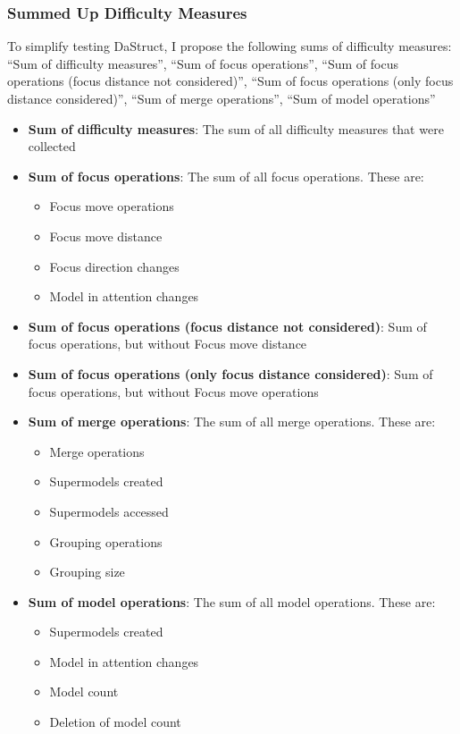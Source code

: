 \documentclass[hidelinks]{scrartcl}
\begin{document}
\subsubsection{Summed Up Difficulty Measures}\label{sec:diff_measures_summed_up}
To simplify testing DaStruct, I propose the following sums of difficulty measures:
``Sum of difficulty measures'', ``Sum of focus operations'', ``Sum of focus operations (focus distance not considered)'', ``Sum of focus operations (only focus distance considered)'', ``Sum of merge operations'', ``Sum of model operations''
\begin{itemize}
	\item \textbf{Sum of difficulty measures}: The sum of all difficulty measures that were collected
	\item \textbf{Sum of focus operations}: The sum of all focus operations. These are:
	\begin{itemize}
		\item Focus move operations
		\item Focus move distance
		\item Focus direction changes
		\item Model in attention changes
	\end{itemize}
	\item \textbf{Sum of focus operations (focus distance not considered)}: Sum of focus operations, but without Focus move distance
	\item \textbf{Sum of focus operations (only focus distance considered)}: Sum of focus operations, but without Focus move operations
	\item \textbf{Sum of merge operations}: The sum of all merge operations. These are:
	\begin{itemize}
		\item Merge operations
		\item Supermodels created
		\item Supermodels accessed
		\item Grouping operations
		\item Grouping size
	\end{itemize}
	\item \textbf{Sum of model operations}: The sum of all model operations. These are:
	\begin{itemize}
		\item Supermodels created
		\item Model in attention changes
		\item Model count
		\item Deletion of model count
	\end{itemize}
\end{itemize}
\end{document}
